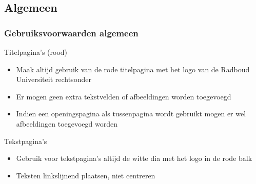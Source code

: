 \documentclass[showdate=true, slidenumbers=relative]{beamerruhuisstijl169}
\begin{document}
\subsection{Algemeen}
\begin{frame}\label{sl:gvwa}
    \frametitle{Gebruiksvoorwaarden algemeen}

    \begin{block}{Titelpagina's (rood)}
        \begin{itemize}
            \item Maak altijd gebruik van de rode titelpagina met het logo van de Radboud Universiteit rechtsonder
            \item Er mogen geen extra tekstvelden of afbeeldingen worden toegevoegd
            \item Indien een openingspagina als tussenpagina wordt gebruikt mogen er wel afbeeldingen toegevoegd worden
        \end{itemize}
    \end{block}

    \begin{block}{Tekstpagina's}
        \begin{itemize}
            \item Gebruik voor tekstpagina's altijd de witte dia met het logo in de rode balk
            \item Teksten linkslijnend plaatsen, niet centreren
        \end{itemize}
    \end{block}
\end{frame}
\end{document}
